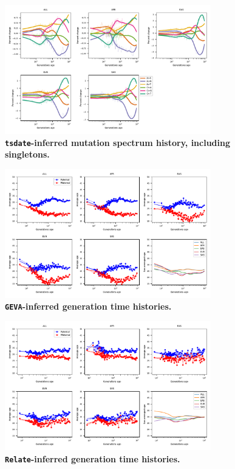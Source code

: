 \documentclass[]{article}
\begin{document}
\begin{figure}[ht!]
    \centering
    \includegraphics[width=0.8\textwidth]{../plots/spectrum_history.tsdate.max_age.10000.singletons.pdf}
    \caption{
        \textbf{\texttt{tsdate}-inferred mutation spectrum history, including singletons.}
    }
    \label{fig:tsdate-spectra-singletons}
\end{figure}


\begin{figure}[ht!]
    \centering
    \includegraphics[width=0.8\textwidth]{../plots/inferred_generation_times.geva.pdf}
    \caption{
        \textbf{\texttt{GEVA}-inferred generation time histories.}
    }
    \label{fig:geva-gen-times}
\end{figure}


\begin{figure}[ht!]
    \centering
    \includegraphics[width=0.8\textwidth]{../plots/inferred_generation_times.relate.pdf}
    \caption{
        \textbf{\texttt{Relate}-inferred generation time histories.}
    }
    \label{fig:relate-gen-times}
\end{figure}
\end{document}
